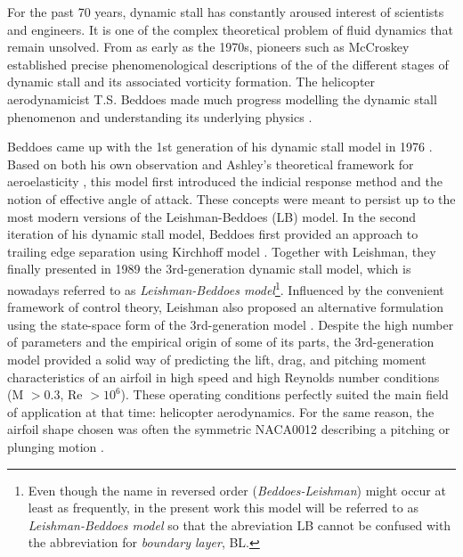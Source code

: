 For the past 70 years, dynamic stall has constantly aroused interest of scientists and engineers. 
It is one of the complex theoretical problem of fluid dynamics that remain unsolved.
From as early as the 1970s, pioneers such as McCroskey \cite{mccroskey_dynamic_1976} established precise phenomenological descriptions of the of the different stages of dynamic stall and its associated vorticity formation. The helicopter aerodynamicist T.S. Beddoes made much progress modelling the dynamic stall phenomenon and understanding its underlying physics \cite{beddoes_synthesis_1976, beddoes_representation_1983}. 

Beddoes came up with the 1st generation of his dynamic stall model in 1976 \cite{beddoes_synthesis_1976}.
Based on both his own observation and Ashley's theoretical framework for aeroelasticity \cite{ashley_piston_1956}, this model first introduced the indicial response method and the notion of effective angle of attack. These concepts were meant to persist up to the most modern versions of the Leishman-Beddoes (LB) model. 
In the second iteration of his dynamic stall model, Beddoes first provided an approach to trailing edge separation using Kirchhoff model \cite{beddoes_representation_1983}. 
Together with Leishman, they finally presented in 1989 the 3rd-generation \cite{leishman_semi-empirical_1989} dynamic stall model, which is nowadays referred to as \textit{Leishman-Beddoes model}\footnote{Even though the name in reversed order (\textit{Beddoes-Leishman}) might occur at least as frequently, in the present work this model will be referred to as \textit{Leishman-Beddoes model} so that the abreviation LB cannot be confused with the abbreviation for \textit{boundary layer}, BL.}.
Influenced by the convenient framework of control theory, Leishman also proposed an alternative formulation using the state-space form of the 3rd-generation model \cite{leishman_state-space_1989}.
Despite the high number of parameters and the empirical origin of some of its parts, the 3rd-generation model provided a solid way of predicting the lift, drag, and pitching moment characteristics of an airfoil in high speed and high Reynolds number conditions (M $>0.3$, Re $> 10^6$). These operating conditions perfectly suited the main field of application at that time: helicopter aerodynamics. For the same reason, the airfoil shape chosen was often the symmetric NACA0012 describing a pitching or plunging motion \cite{beddoes_representation_1983,leishman_semi-empirical_1989,sheng_new_2006,sheng_improved_2007, tank_possibility_2017,rocchio_simple_2020}. 

